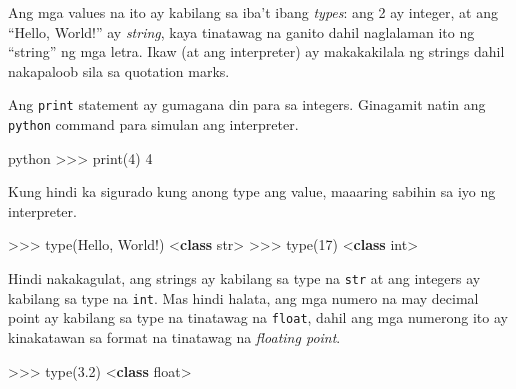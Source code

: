 \documentclass[10pt,]{book}
\newenvironment{Shaded}{}{}
\newcommand{\BuiltInTok}[1]{\textcolor[rgb]{0.00,0.50,0.00}{#1}}
\newcommand{\DecValTok}[1]{\textcolor[rgb]{0.25,0.63,0.44}{#1}}
\newcommand{\FloatTok}[1]{\textcolor[rgb]{0.25,0.63,0.44}{#1}}
\newcommand{\KeywordTok}[1]{\textcolor[rgb]{0.00,0.44,0.13}{\textbf{#1}}}
\newcommand{\NormalTok}[1]{#1}
\newcommand{\OperatorTok}[1]{\textcolor[rgb]{0.40,0.40,0.40}{#1}}
\newcommand{\StringTok}[1]{\textcolor[rgb]{0.25,0.44,0.63}{#1}}
\begin{document}
Ang mga values na ito ay kabilang sa iba't ibang \emph{types}: ang 2 ay
integer, at ang ``Hello, World!'' ay \emph{string}, kaya tinatawag na
ganito dahil naglalaman ito ng ``string'' ng mga letra. Ikaw (at ang
interpreter) ay makakakilala ng strings dahil nakapaloob sila sa
quotation marks.


Ang \texttt{print} statement ay gumagana din para sa integers. Ginagamit
natin ang \texttt{python} command para simulan ang interpreter.

\begin{Shaded}
\begin{Highlighting}[]
\NormalTok{python}
\OperatorTok{\textgreater{}\textgreater{}\textgreater{}} \BuiltInTok{print}\NormalTok{(}\DecValTok{4}\NormalTok{)}
\DecValTok{4}
\end{Highlighting}
\end{Shaded}

Kung hindi ka sigurado kung anong type ang value, maaaring sabihin sa
iyo ng interpreter.

\begin{Shaded}
\begin{Highlighting}[]
\OperatorTok{\textgreater{}\textgreater{}\textgreater{}} \BuiltInTok{type}\NormalTok{(}\StringTok{\textquotesingle{}Hello, World!\textquotesingle{}}\NormalTok{)}
\OperatorTok{\textless{}}\KeywordTok{class} \StringTok{\textquotesingle{}str\textquotesingle{}}\OperatorTok{\textgreater{}}
\OperatorTok{\textgreater{}\textgreater{}\textgreater{}} \BuiltInTok{type}\NormalTok{(}\DecValTok{17}\NormalTok{)}
\OperatorTok{\textless{}}\KeywordTok{class} \StringTok{\textquotesingle{}int\textquotesingle{}}\OperatorTok{\textgreater{}}
\end{Highlighting}
\end{Shaded}

Hindi nakakagulat, ang strings ay kabilang sa type na \texttt{str} at
ang integers ay kabilang sa type na \texttt{int}. Mas hindi halata, ang
mga numero na may decimal point ay kabilang sa type na tinatawag na
\texttt{float}, dahil ang mga numerong ito ay kinakatawan sa format na
tinatawag na \emph{floating point}.

   
  

\begin{Shaded}
\begin{Highlighting}[]
\OperatorTok{\textgreater{}\textgreater{}\textgreater{}} \BuiltInTok{type}\NormalTok{(}\FloatTok{3.2}\NormalTok{)}
\OperatorTok{\textless{}}\KeywordTok{class} \StringTok{\textquotesingle{}float\textquotesingle{}}\OperatorTok{\textgreater{}}
\end{Highlighting}
\end{Shaded}
\end{document}
